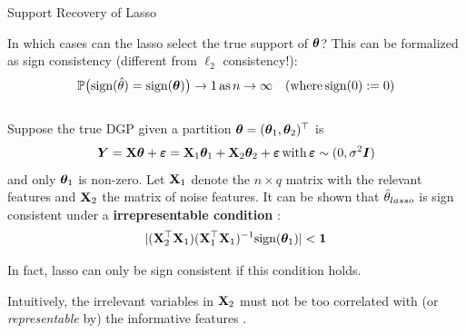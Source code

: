\documentclass[11pt,compress,t,notes=noshow, xcolor=table]{beamer}
\begin{document}
\begin{vbframe}{Support Recovery of Lasso}
\begin{small}
In which cases can the lasso select the true support of $\bm{\theta}$? This can be formalized as sign consistency (different from $\ell_2$ consistency!): 
\begin{align*}
\mathbb{P}\big(\text{sign}(\hat{\theta})=\text{sign}(\bm{\theta})\big) \to 1 \, \text{as} \, n \to \infty \quad (\text{where}\,\text{sign}(0):=0) 
\end{align*}
\\
Suppose the true DGP given a partition $\bm{\theta}=(\bm{\theta}_1,\bm{\theta}_2)^{\top}$ is 
\begin{align*}
    \bm{Y}=\mathbf{X}\bm{\theta} + \bm{\varepsilon} = \mathbf{X}_1 \bm{\theta}_1 + \mathbf{X}_2 \bm{\theta}_2 + \bm{\varepsilon}\,\text{with}\,\bm{\varepsilon}\sim (0,\sigma^2 \boldsymbol{I})
\end{align*}
and only $\bm{\theta}_1$ is non-zero.
\vspace{0.1cm}
Let $\mathbf{X}_1$ denote the $n \times q$ matrix with the relevant features and $\mathbf{X}_2$ the matrix of noise features. It can be shown that $\hat{\theta}_{lasso}$ is sign consistent under a \textbf{irrepresentable condition} :
\begin{align*}
    \vert (\Xmat_2^{\top} \Xmat_1)(\Xmat_1^{\top} \Xmat_1)^{-1} \text{sign}(\thetab_1)\vert < \bm{1} %
\end{align*}

In fact, lasso can only be sign consistent if this condition holds.

Intuitively, the irrelevant variables in $\mathbf{X}_2$ must not be too correlated with (or \textit{representable} by) the informative features .
\end{small}
\end{vbframe}

\endlecture
\end{document}
